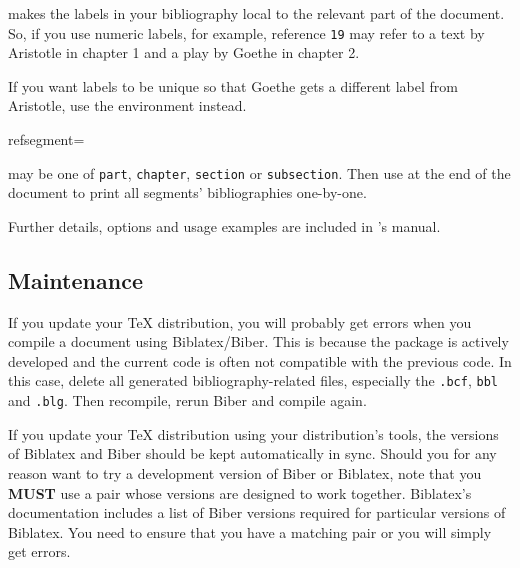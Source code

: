  makes the labels in your bibliography local to the relevant part of the document.
So, if you use numeric labels, for example, reference \texttt{19} may refer to a text by Aristotle in chapter 1 and a play by Goethe in chapter 2.

If you want labels to be unique so that Goethe gets a different label from Aristotle, use the  environment instead.
\begin{semiverbatim}
  refsegment=
\end{semiverbatim}
 may be one of \texttt{part}, \texttt{chapter}, \texttt{section} or \texttt{subsection}.
Then use  at the end of the document to print all segments' bibliographies one-by-one.

Further details, options and usage examples are included in 's manual.


\subsection{Maintenance}\label{subsec:maintain}


If you update your \TeX{} distribution, you will probably get errors when you compile a document using Biblatex/Biber.
This is because the package is actively developed and the current code is often not compatible with the previous code.
In this case, delete all generated bibliography-related files, especially the \texttt{.bcf}, \texttt{bbl} and \texttt{.blg}.
Then recompile, rerun Biber and compile again.

If you update your \TeX{} distribution using your distribution's tools, the versions of Biblatex and Biber should be kept automatically in sync.
Should you for any reason want to try a development version of Biber or Biblatex, note that you \textbf{MUST} use a pair whose versions are designed to work together.
Biblatex's documentation includes a list of Biber versions required for particular versions of Biblatex.
You need to ensure that you have a matching pair or you will simply get errors.




